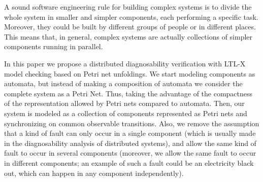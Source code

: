 \documentclass[a4paper]{article}
\begin{document}
A sound software engineering rule for building complex systems is to divide the whole system in smaller and simpler components, each performing a specific task. Moreover, they could be built by different groups of people or in different places. This means that, in general, complex systems are actually collections of simpler components running in parallel. 

In this paper we propose a distributed diagnosability verification with LTL-X model checking based on Petri net unfoldings. We start modeling components as automata, but instead of making a composition of automata we consider the complete system as a Petri Net. Thus, taking the advantage of the compactness of the representation allowed by Petri nets compared to automata. Then, our system is modeled as a collection of components represented as Petri nets and synchronizing on common observable transitions. Also, we remove the assumption that a kind of fault can only occur in a single component (which is usually made in the diagnosability analysis of distributed systems), and allow the same kind of fault to occur in several components (moreover, we allow the same fault to occur in different components; an example of such a fault could be an electricity black out, which can happen in any component independently). 
\end{document}

